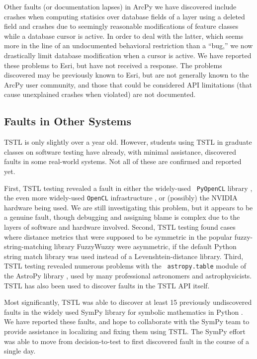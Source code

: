 Other faults (or documentation lapses) in ArcPy we have discovered include crashes when computing
statisics over database fields of a layer using a deleted field and
crashes due to seemingly reasonable modifications of feature classes
while a database cursor is active.  In order to deal with the latter,
which seems more in the line of an undocumented behavioral restriction
than a ``bug,'' we now drastically limit database modification when a
cursor is active.  We have reported these problems to Esri, but have
not received a response.  The problems discovered may be previously
known to Esri, but are not generally known to the ArcPy user
community, and those that could be considered API limitations (that
cause unexplained crashes when violated) are not documented.

\subsection{Faults in Other Systems}

TSTL  is only slightly over a year old.  However, students using
TSTL in graduate classes on software testing have already, with
minimal assistance, discovered faults in some real-world systems.  Not
all of these are confirmed and reported yet.

First, TSTL testing revealed a fault in either the widely-used {\tt
  PyOpenCL} library \cite{PyOpenCL}, the even more widely-used {\tt OpenCL}
infrastructure \cite{OpenCL}, or (possibly) the NVIDIA hardware being used.  We are
still investigating this problem, but it appears to be a genuine
fault, though debugging and assigning blame is complex due to the
layers of software and hardware involved.  Second, TSTL testing found cases where distance metrics that were supposed to
be symmetric in the popular fuzzy-string-matching library FuzzyWuzzy \cite{FuzzyWuzzy}
were asymmetric, if the default Python string match library was used
instead of a Levenshtein-distance library.
Third, TSTL testing revealed numerous problems with the {\tt
  astropy.table} module of the AstroPy
library \cite{AstroPy}, used by many professional astronomers and astrophysicists.
TSTL has also been used to discover faults in the TSTL API itself.

Most significantly, TSTL was able to discover at least 15
previously undiscovered faults in the widely used SymPy library for
symbolic mathematics in Python \cite{sympy}.  We have reported these
faults, and hope to collaborate with the SymPy team to provide
assistance in localizing and fixing them using TSTL.  The SymPy
effort was able to move from
decision-to-test to first discovered fault in the course of a single day.